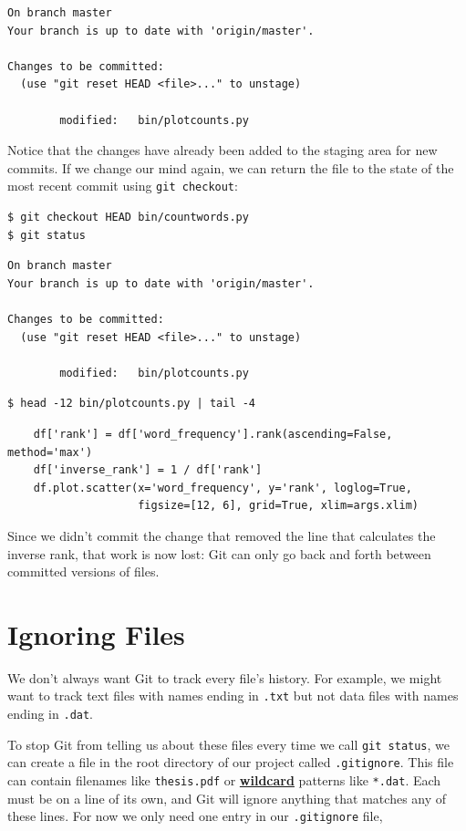 \documentclass[
]{krantz}
\newcommand{\gref}[2]{\hyperlink{#2}{\textbf{#1}}}
\begin{document}
\begin{verbatim}
On branch master
Your branch is up to date with 'origin/master'.

Changes to be committed:
  (use "git reset HEAD <file>..." to unstage)

        modified:   bin/plotcounts.py
\end{verbatim}

Notice that the changes have already been added to the staging area for new commits.
If we change our mind again,
we can return the file to the state of the most recent commit using \texttt{git\ checkout}:

\begin{verbatim}
$ git checkout HEAD bin/countwords.py
$ git status
\end{verbatim}

\begin{verbatim}
On branch master
Your branch is up to date with 'origin/master'.

Changes to be committed:
  (use "git reset HEAD <file>..." to unstage)

        modified:   bin/plotcounts.py
\end{verbatim}

\begin{verbatim}
$ head -12 bin/plotcounts.py | tail -4
\end{verbatim}

\begin{verbatim}
    df['rank'] = df['word_frequency'].rank(ascending=False, method='max')
    df['inverse_rank'] = 1 / df['rank']
    df.plot.scatter(x='word_frequency', y='rank', loglog=True,
                    figsize=[12, 6], grid=True, xlim=args.xlim)
\end{verbatim}

Since we didn't commit the change
that removed the line that calculates the inverse rank,
that work is now lost:
Git can only go back and forth between committed versions of files.

\hypertarget{git-cmdline-ignore}{%
\section{Ignoring Files}\label{git-cmdline-ignore}}

We don't always want Git to track every file's history.
For example,
we might want to track text files with names ending in \texttt{.txt}
but not data files with names ending in \texttt{.dat}.

To stop Git from telling us about these files every time we call \texttt{git\ status},
we can create a file in the root directory of our project called \texttt{.gitignore}.
This file can contain filenames like \texttt{thesis.pdf}
or \gref{wildcard}{wildcard} patterns like \texttt{*.dat}.
Each must be on a line of its own,
and Git will ignore anything that matches any of these lines.
For now we only need one entry in our \texttt{.gitignore} file,
\end{document}
